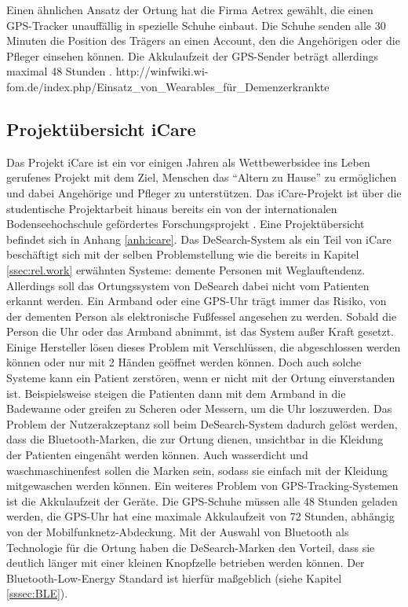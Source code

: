 Einen ähnlichen Ansatz der Ortung hat die Firma Aetrex gewählt, die einen GPS-Tracker unauffällig in spezielle Schuhe einbaut. Die Schuhe senden alle 30 Minuten die Position des Trägers an einen Account, den die Angehörigen oder die Pfleger einsehen können. Die Akkulaufzeit der GPS-Sender beträgt allerdings maximal 48 Stunden \citep[Vgl.][]{aetrex}.
http://winfwiki.wi-fom.de/index.php/Einsatz\_von\_Wearables\_für\_Demenzerkrankte\\




\subsection{Projektübersicht iCare}
Das Projekt iCare ist ein vor einigen Jahren als Wettbewerbsidee ins Leben gerufenes Projekt mit dem Ziel, Menschen das \enquote{Altern zu Hause} zu ermöglichen und dabei Angehörige und Pfleger zu unterstützen.  Das iCare-Projekt ist über die studentische Projektarbeit hinaus bereits ein von der internationalen Bodenseehochschule gefördertes Forschungsprojekt \citep[Vgl.][]{icare-dhbw}. Eine Projektübersicht befindet sich in Anhang \ref{anh:icare}.
Das DeSearch-System als ein Teil von iCare beschäftigt sich mit der selben Problemstellung wie die bereits in Kapitel \ref{ssec:rel.work} erwähnten Systeme: demente Personen mit Weglauftendenz. Allerdings soll das Ortungssystem von DeSearch dabei nicht vom Patienten erkannt werden. Ein Armband oder eine GPS-Uhr trägt immer das Risiko, von der dementen Person als elektronische Fußfessel angesehen zu werden. Sobald die Person die Uhr oder das Armband abnimmt, ist das System außer Kraft gesetzt. Einige Hersteller lösen dieses Problem mit Verschlüssen, die abgeschlossen werden können oder nur mit 2 Händen geöffnet werden können. Doch auch solche Systeme kann ein Patient zerstören, wenn er nicht mit der Ortung einverstanden ist. Beispielsweise steigen die Patienten dann mit dem Armband in die Badewanne oder greifen zu Scheren oder Messern, um die Uhr loszuwerden. Das Problem der Nutzerakzeptanz soll beim DeSearch-System dadurch gelöst werden, dass die Bluetooth-Marken, die zur Ortung dienen, unsichtbar in die Kleidung der Patienten eingenäht werden können. Auch wasserdicht und waschmaschinenfest sollen die Marken sein, sodass sie einfach mit der Kleidung mitgewaschen werden können. Ein weiteres Problem von GPS-Tracking-Systemen ist die Akkulaufzeit der Geräte. Die GPS-Schuhe müssen alle 48 Stunden geladen werden, die GPS-Uhr hat eine maximale Akkulaufzeit von 72 Stunden, abhängig von der Mobilfunknetz-Abdeckung. Mit der Auswahl von Bluetooth als Technologie für die Ortung haben die DeSearch-Marken den Vorteil, dass sie deutlich länger mit einer kleinen Knopfzelle betrieben werden können. Der Bluetooth-Low-Energy Standard ist hierfür maßgeblich (siehe Kapitel \ref{sssec:BLE}).

